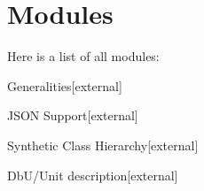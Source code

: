 \section{Modules}
Here is a list of all modules\-:\begin{DoxyCompactList}
\item {}
\item Generalities{\ttfamily  \mbox{[}external\mbox{]}}\item J\-S\-O\-N Support{\ttfamily  \mbox{[}external\mbox{]}}\item Synthetic Class Hierarchy{\ttfamily  \mbox{[}external\mbox{]}}\item Db\-U/\-Unit description{\ttfamily  \mbox{[}external\mbox{]}}\end{DoxyCompactList}
